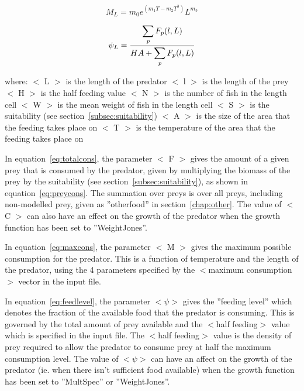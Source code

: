 \documentclass [a4paper, 10pt]{book}
\begin{document}
\begin{equation}\label{eq:maxcons}
M_{L} = m_{0} e^{(m_{1}T - m_{2}T^3)} L^{m_{3}}
\end{equation}

\begin{equation}\label{eq:feedlevel}
\psi_{L} = \frac{\displaystyle \sum_{\it p} F_{p}(l, L)}{H A + \displaystyle \sum_{\it p} F_{p}(l, L)}
\end{equation}

where:\newline
$<$ L $>$ is the length of the predator\newline
$<$ l $>$ is the length of the prey\newline
$<$ H $>$ is the half feeding value\newline
$<$ N $>$ is the number of fish in the length cell\newline
$<$ W $>$ is the mean weight of fish in the length cell\newline
$<$ S $>$ is the suitability (see section~\ref{subsec:suitability})\newline
$<$ A $>$ is the size of the area that the feeding takes place on\newline
$<$ T $>$ is the temperature of the area that the feeding takes place on

\bigskip
In equation~\ref{eq:totalcons}, the parameter $<$ F $>$ gives the amount of a given prey that is consumed by the predator, given by multiplying the biomass of the prey by the suitability (see section~\ref{subsec:suitability}), as shown in equation~\ref{eq:preycons}.  The summation over preys is over all preys, including non-modelled prey, given as ''otherfood'' in section~\ref{chap:other}.  The value of $<$ C $>$ can also have an effect on the growth of the predator when the growth function has been set to ''WeightJones''.

\bigskip
In equation~\ref{eq:maxcons}, the parameter $<$ M $>$ gives the maximum possible consumption for the predator.  This is a function of temperature and the length of the predator, using the 4 parameters specified by the $<$maximum consumption$>$ vector in the input file.

\bigskip
In equation~\ref{eq:feedlevel}, the parameter $<\psi>$ gives the ''feeding level'' which denotes the fraction of the available food that the predator is consuming.  This is governed by the total amount of prey available and the $<$half feeding$>$ value which is specified in the input file.  The $<$half feeding$>$ value is the density of prey required to allow the predator to consume prey at half the maximum consumption level.  The value of $<\psi>$ can have an affect on the growth of the predator (ie. when there isn't sufficient food available) when the growth function has been set to ''MultSpec'' or ''WeightJones''.
\end{document}
